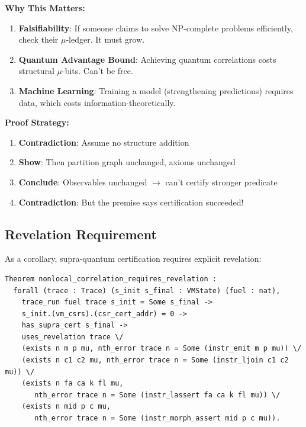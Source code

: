 \textbf{Why This Matters:}
\begin{enumerate}
    \item \textbf{Falsifiability}: If someone claims to solve NP-complete problems efficiently, check their $\mu$-ledger. It must grow.
    \item \textbf{Quantum Advantage Bound}: Achieving quantum correlations costs structural $\mu$-bits. Can't be free.
    \item \textbf{Machine Learning}: Training a model (strengthening predictions) requires data, which costs information-theoretically.
\end{enumerate}

\textbf{Proof Strategy:}
\begin{enumerate}
    \item \textbf{Contradiction}: Assume no structure addition
    \item \textbf{Show}: Then partition graph unchanged, axioms unchanged
    \item \textbf{Conclude}: Observables unchanged $\rightarrow$ can't certify stronger predicate
    \item \textbf{Contradiction}: But the premise says certification succeeded!
\end{enumerate}

\subsection{Revelation Requirement}

As a corollary, supra-quantum certification requires explicit revelation:

\begin{lstlisting}
Theorem nonlocal_correlation_requires_revelation :
  forall (trace : Trace) (s_init s_final : VMState) (fuel : nat),
    trace_run fuel trace s_init = Some s_final ->
    s_init.(vm_csrs).(csr_cert_addr) = 0 ->
    has_supra_cert s_final ->
    uses_revelation trace \/
    (exists n m p mu, nth_error trace n = Some (instr_emit m p mu)) \/
    (exists n c1 c2 mu, nth_error trace n = Some (instr_ljoin c1 c2 mu)) \/
    (exists n fa ca k fl mu,
       nth_error trace n = Some (instr_lassert fa ca k fl mu)) \/
    (exists n mid p c mu,
       nth_error trace n = Some (instr_morph_assert mid p c mu)).
\end{lstlisting}

